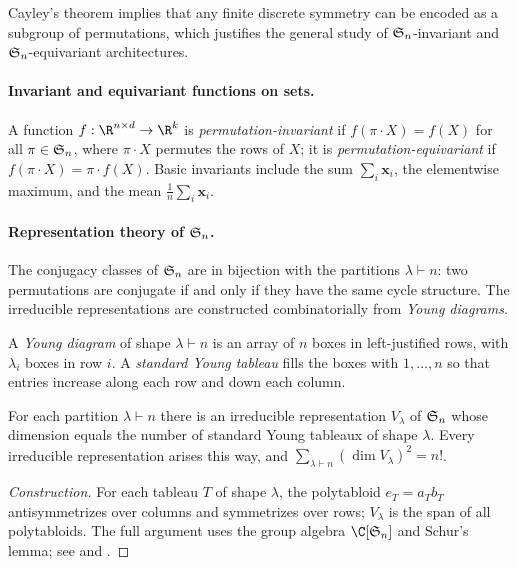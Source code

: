 Cayley's theorem implies that any finite discrete symmetry can be encoded as a
subgroup of permutations, which justifies the general study of
$\mathfrak{S}_n$-invariant and $\mathfrak{S}_n$-equivariant architectures.

\paragraph{Invariant and equivariant functions on sets.}
A function $f: \R^{n \times d} \to \R^k$ is \emph{permutation-invariant} if
$f(\pi \cdot X) = f(X)$ for all $\pi \in \mathfrak{S}_n$, where $\pi \cdot X$ permutes the
rows of $X$; it is \emph{permutation-equivariant} if $f(\pi \cdot X) = \pi \cdot
f(X)$. Basic invariants include the sum $\sum_i \mathbf{x}_i$, the elementwise
maximum, and the mean $\tfrac{1}{n}\sum_i \mathbf{x}_i$.

\paragraph{Representation theory of $\mathfrak{S}_n$.}
The conjugacy classes of $\mathfrak{S}_n$ are in bijection with the partitions $\lambda
\vdash n$: two permutations are conjugate if and only if they have the same cycle
structure. The irreducible representations are constructed combinatorially from
\emph{Young diagrams}.

\begin{definition}
\label{def:groups:young}
A \emph{Young diagram} of shape $\lambda \vdash n$ is an array of $n$ boxes in
left-justified rows, with $\lambda_i$ boxes in row $i$. A \emph{standard Young
tableau} fills the boxes with $1, \dots, n$ so that entries increase along each
row and down each column.
\end{definition}

\begin{theorem}
\label{thm:groups:sn-irreps}
For each partition $\lambda \vdash n$ there is an irreducible representation
$V_\lambda$ of $\mathfrak{S}_n$ whose dimension equals the number of standard Young
tableaux of shape $\lambda$. Every irreducible representation arises this way,
and $\sum_{\lambda \vdash n} (\dim V_\lambda)^2 = n!$.
\end{theorem}

\begin{proof}[Construction]
For each tableau $T$ of shape $\lambda$, the polytabloid $e_T = a_T b_T$
antisymmetrizes over columns and symmetrizes over rows; $V_\lambda$ is the span
of all polytabloids. The full argument uses the group algebra $\C[\Sym_n]$ and
Schur's lemma; see \citet{sagan2001symmetric} and \citet{fulton1997young}.
\end{proof}

